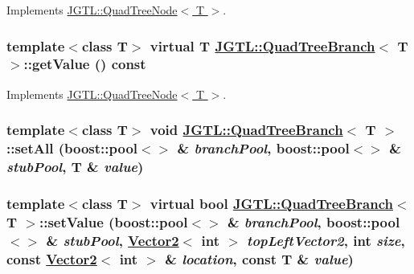 Implements \hyperlink{class_j_g_t_l_1_1_quad_tree_node_bc249b527b146888c21dac71783f42b6}{JGTL::Quad\-Tree\-Node$<$ T $>$}.\hypertarget{class_j_g_t_l_1_1_quad_tree_branch_131c37ee0dc66949927c62f9b438816d}{
\subsubsection[getValue]{\setlength{\rightskip}{0pt plus 5cm}template$<$class T$>$ virtual T \hyperlink{class_j_g_t_l_1_1_quad_tree_branch}{JGTL::Quad\-Tree\-Branch}$<$ T $>$::get\-Value () const}}
\label{class_j_g_t_l_1_1_quad_tree_branch_131c37ee0dc66949927c62f9b438816d}




Implements \hyperlink{class_j_g_t_l_1_1_quad_tree_node_b92e9755284317f2d8102f028b0481c7}{JGTL::Quad\-Tree\-Node$<$ T $>$}.\hypertarget{class_j_g_t_l_1_1_quad_tree_branch_6c81dbe713996cf7ff82e8b093ede81e}{
\subsubsection[setAll]{\setlength{\rightskip}{0pt plus 5cm}template$<$class T$>$ void \hyperlink{class_j_g_t_l_1_1_quad_tree_branch}{JGTL::Quad\-Tree\-Branch}$<$ T $>$::set\-All (boost::pool$<$$>$ \& {\em branch\-Pool}, boost::pool$<$$>$ \& {\em stub\-Pool}, T \& {\em value})}}
\label{class_j_g_t_l_1_1_quad_tree_branch_6c81dbe713996cf7ff82e8b093ede81e}


\hypertarget{class_j_g_t_l_1_1_quad_tree_branch_82dcced1ba01d374ce25b8d67b27302c}{
\subsubsection[setValue]{\setlength{\rightskip}{0pt plus 5cm}template$<$class T$>$ virtual bool \hyperlink{class_j_g_t_l_1_1_quad_tree_branch}{JGTL::Quad\-Tree\-Branch}$<$ T $>$::set\-Value (boost::pool$<$$>$ \& {\em branch\-Pool}, boost::pool$<$$>$ \& {\em stub\-Pool}, \hyperlink{class_j_g_t_l_1_1_vector2}{Vector2}$<$ int $>$ {\em top\-Left\-Vector2}, int {\em size}, const \hyperlink{class_j_g_t_l_1_1_vector2}{Vector2}$<$ int $>$ \& {\em location}, const T \& {\em value})}}
\label{class_j_g_t_l_1_1_quad_tree_branch_82dcced1ba01d374ce25b8d67b27302c}




